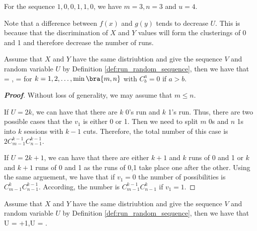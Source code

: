 \begin{example}
For the sequence $1,0,0,1,1,0$, we have $m=3,n=3$ and $u=4$.
\end{example}

\begin{remark}
Note that a difference between $f(x)$ and $g(y)$ tends to decrease $U$. This is because that the discrimination of $X$ and $Y$ values will form the clusterings of 0 and 1 and therefore decrease the number of runs.
\end{remark}

\begin{theorem}\label{thm:run_probability}
Assume that $X$ and $Y$ have the same distriubtion and give the sequence $V$ and random variable $U$ by Definition \ref{def:run_random_sequence}, then we have that
\be
\pro{} = ,\qquad \pro{} = 
\ee
for $k = 1,2,\dots,\min\bra{m,n}$ with $C^a_b =0$ if $a>b$.
\end{theorem}

\begin{proof}[\bf Proof]
Without loss of generality, we may assume that $m\leq n$.

If $U = 2k$, we can have that there are $k$ 0's run and $k$ 1's run. Thus, there are two possible cases that the $v_1$ is either 0 or 1.  Then we need to split $m$ 0s and $n$ 1s into $k$ sessions with $k-1$ cuts. Therefore, the total number of this case is $2C^{k-1}_{m-1}C^{k-1}_{n-1}$.

If $U = 2k+1$, we can have that there are either $k+1$ and $k$ runs of 0 and 1 or  $k$ and $k+1$ runs of 0 and 1 as the runs of 0,1 take place one after the other. Using the same arguement, we have that if $v_1=0$ the number of possibilities is $C^k_{m-1}C^{k-1}_{n-1}$. According, the number is $C^{k-1}_{m-1}C^{k}_{n-1}$ if $v_1 =1$.
\end{proof}

\begin{theorem}
Assume that $X$ and $Y$ have the same distriubtion and give the sequence $V$ and random variable $U$ by Definition \ref{def:run_random_sequence}, then we have that
\be
\E U = +1,\qquad \var U = .
\ee
\end{theorem}

